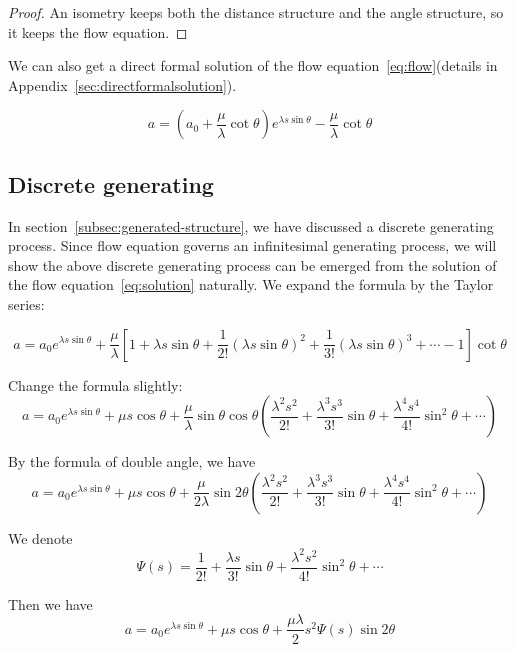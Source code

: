 \begin{proof}
  An isometry keeps both the distance structure and the angle structure, so it keeps the flow equation.
\end{proof}

We can also get a direct formal solution of the flow equation~\eqref{eq:flow}(details in Appendix~\ref{sec:directformalsolution}).

\begin{equation}
   a = (a_0 + \frac{\mu}{\lambda} \cot \theta) e^{\lambda s \sin \theta} - \frac{\mu}{\lambda} \cot \theta\label{eq:solution}
\end{equation}

\subsection{Discrete generating}\label{subsec:discrete-generating}

In section~\ref{subsec:generated-structure}, we have discussed a discrete generating process.
Since flow equation governs an infinitesimal generating process,
we will show the above discrete generating process can be emerged from the solution of the flow equation~\eqref{eq:solution} naturally.
We expand the formula by the Taylor series:

\[
    a =  a_0 e^{\lambda s \sin \theta} + \frac{\mu}{\lambda} [1 + \lambda s \sin \theta + \frac{1}{2!} (\lambda s \sin \theta)^2  + \frac{1}{3!} (\lambda s \sin \theta)^3 + \cdots - 1] \cot \theta
\]

Change the formula slightly:
\[
    a = a_0 e^{\lambda s \sin \theta} + \mu s \cos \theta + \frac{\mu}{\lambda} \sin \theta \cos \theta (\frac{\lambda^2s^2}{2!} + \frac{\lambda^3s^3}{3!} \sin \theta + \frac{\lambda^4s^4}{4!} \sin^2 \theta + \cdots)
\]

By the formula of double angle, we have
\[
    a = a_0 e^{\lambda s \sin \theta} + \mu s \cos \theta + \frac{\mu}{2\lambda} \sin 2\theta (\frac{\lambda^2s^2}{2!} + \frac{\lambda^3s^3}{3!} \sin \theta + \frac{\lambda^4s^4}{4!} \sin^2 \theta + \cdots)
\]

We denote
\begin{equation}
    \Psi(s) = \frac{1}{2!} + \frac{\lambda s}{3!} \sin \theta + \frac{\lambda^2 s^2}{4!} \sin^2 \theta + \cdots
\end{equation}

Then we have
\begin{equation}
    a = a_0 e^{\lambda s \sin \theta} + \mu s \cos \theta + \frac{\mu\lambda}{2} s^2 \Psi(s) \sin 2\theta
\end{equation}

